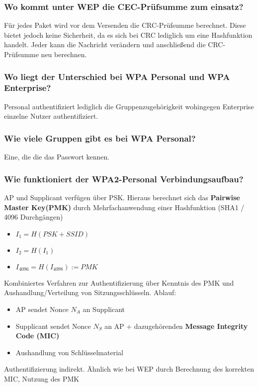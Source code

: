 	\subsubsection{Wo kommt unter WEP die CEC-Prüfsumme zum einsatz?}
	Für jedes Paket wird vor dem Versenden die CRC-Prüfsumme berechnet. Diese bietet jedoch keine Sicherheit, da es sich bei CRC lediglich um eine Hashfunktion handelt. Jeder kann die Nachricht verändern und anschließend die CRC-Prüfsumme neu berechnen.
	
	\subsubsection{Wo liegt der Unterschied bei WPA Personal und WPA Enterprise?}
	Personal authentifiziert lediglich die Gruppenzugehörigkeit wohingegen Enterprise einzelne Nutzer authentifiziert.
	
	\subsubsection{Wie viele Gruppen gibt es bei WPA Personal?}
	Eine, die die das Passwort kennen.
	
	\subsubsection{Wie funktioniert der WPA2-Personal Verbindungsaufbau?}
	AP und Supplicant verfügen über PSK. Hieraus berechnet sich das \textbf{Pairwise Master Key(PMK)} durch Mehrfachanwendung einer Hashfunktion (SHA1 / 4096 Durchgängen) 
		\begin{itemize}
			\item $I_1 = H(PSK + SSID)$
			\item $I_2 = H(I_1)$
			\item $I_{4096} = H(I_4098) := PMK$
		\end{itemize}
	
	Kombiniertes Verfahren zur Authentifizierung über Kenntnis des PMK und Aushandlung/Verteilung von Sitzungsschlüsseln.
	Ablauf:
		\begin{itemize}
			\item AP sendet Nonce $N_A$ an Supplicant
			\item Supplicant sendet Nonce $N_S$ an AP + dazugehörenden \textbf{Message Integrity Code (MIC)}
			\item Aushandlung von Schlüsselmaterial
		\end{itemize}
		Authentifizierung indirekt. Ähnlich wie bei WEP durch Berechnung des korrekten MIC, Nutzung des PMK			
		
